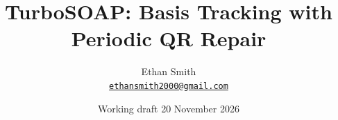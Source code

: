 \title{TurboSOAP: Basis Tracking with Periodic QR Repair}
\author{Ethan Smith\\{\small \href{mailto:ethansmith2000@gmail.com}{\nolinkurl{ethansmith2000@gmail.com}}}}
\date{Working draft \textbar{} 20 November 2026}
